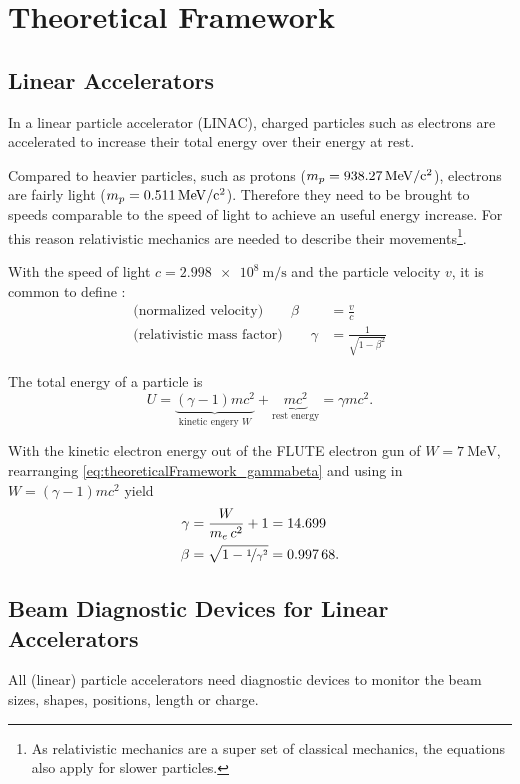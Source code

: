 \chapter{Theoretical Framework}
\section{Linear Accelerators}
In a linear particle accelerator (LINAC), charged particles such as electrons are accelerated to increase their total energy over their energy at rest.

Compared to heavier particles, such as protons ($m_p=\SI{938.27}{\mega\eV\per c\squared}$), electrons are fairly light ($m_p=\SI{0.511}{\mega\eV\per c\squared}$). Therefore they need to be brought to speeds comparable to the speed of light to achieve an useful energy increase. For this reason relativistic mechanics are needed to describe their movements\footnote{As relativistic mechanics are a super set of classical mechanics, the equations also apply for slower particles.}. \cite{Hinterberger1997}

With the speed of light $c=\SI{2.998e8}{\m\per\s}$ and the particle velocity $v$, it is common to define \cite{Wangler2008}:
\begin{align}\label{eq:theoreticalFramework_gammabeta}
\text{(normalized velocity)}\qquad\beta &= \frac{v}{c}\\
\text{(relativistic mass factor)}\qquad\gamma &= \frac{1}{\sqrt{1-\beta^2}}
\end{align}

The total energy of a particle is
\begin{equation}
U=\underbrace{\left(\gamma-1\right)mc^2}_{\text{kinetic engery } W} + \underbrace{mc^2}_{\text{rest energy}} = \gamma mc^2.
\end{equation}

With the kinetic electron energy out of the FLUTE electron gun of $W=\SI{7}{\mega\eV}$, rearranging \autoref{eq:theoreticalFramework_gammabeta} and using in $W=\left(\gamma-1\right)mc^2$ yield
\begin{align}
\gamma &= \frac{W}{m_e\,c^2}+1=\num{14.699}\\
\beta &= \sqrt{1-\nicefrac{1}{\gamma^2}}=\num{0.99768}.
\end{align}


\section{Beam Diagnostic Devices for Linear Accelerators}
All (linear) particle accelerators need diagnostic devices to monitor the beam sizes, shapes, positions, length or charge.

